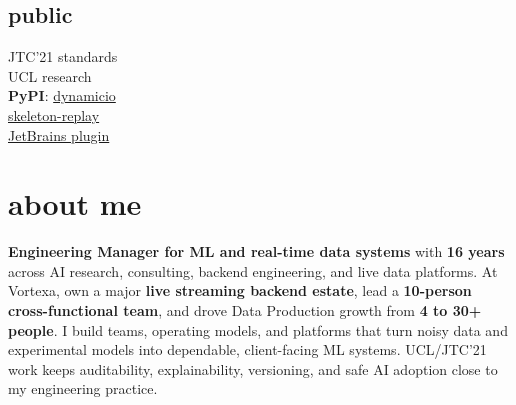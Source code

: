 \documentclass[]{../../../../friggeri-cv}
\begin{document}
\begin{aside}
			\section{public}
			{\footnotesize JTC'21 standards\\UCL research\\\textbf{PyPI}: \href{https://pypi.org/project/dynamicio/}{dynamicio}\\\href{https://pypi.org/project/skeleton-replay/}{skeleton-replay}\\\href{https://plugins.jetbrains.com/plugin/32807-skeleton-replay}{JetBrains plugin}}
	\end{aside}

\section{about me}
{\small \textbf{Engineering Manager for ML and real-time data systems} with \textbf{16 years} across AI research, consulting, backend engineering, and live data platforms. At Vortexa, own a major \textbf{live streaming backend estate}, lead a \textbf{10-person cross-functional team}, and drove Data Production growth from \textbf{4 to 30+ people}. I build teams, operating models, and platforms that turn noisy data and experimental models into dependable, client-facing ML systems. UCL/JTC'21 work keeps auditability, explainability, versioning, and safe AI adoption close to my engineering practice.}
\end{document}
